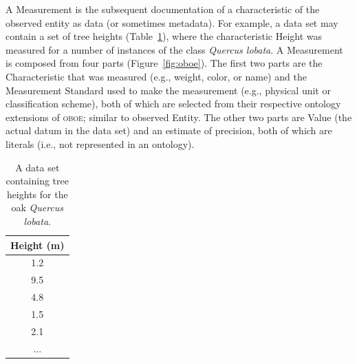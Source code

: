 \documentclass[article,oneside]{memoir}
\newcommand{\obs}{\textsc{oboe}}
\begin{document}
\begin{figure}[hbtp]
\end{figure}

A Measurement is the subsequent documentation of a characteristic of
the observed entity as data (or sometimes metadata).  For example, a
data set may contain a set of tree heights (Table~\ref{tab:lobata}),
where the characteristic Height was measured for a number of instances
of the class \textit{Quercus lobata}.  A Measurement is composed from
four parts (Figure~\ref{fig:oboe}).  The first two parts are the
Characteristic that was measured (e.g., weight, color, or name) and
the Measurement Standard used to make the measurement (e.g., physical
unit or classification scheme), both of which are selected from their
respective ontology extensions of \obs{}; similar to observed Entity.
The other two parts are Value (the actual datum in the data set) and
an estimate of precision, both of which are literals (i.e., not
represented in an ontology).

\begin{table}[htbp]
  \centering
  \begin{tabular}{ @{} c @{} }
    \toprule
    Height (m) \\
    \midrule
    1.2 \\
    9.5 \\
    4.8 \\
    1.5 \\
    2.1 \\
    ... \\
    \bottomrule
  \end{tabular}
  \caption{A data set containing tree heights for the oak \textit{Quercus lobata}.}
 \label{tab:lobata}
\end{table}
\end{document}
